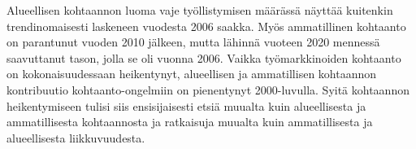\documentclass[12pt]{article}
\begin{document}
Alueellisen kohtaannon luoma vaje työllistymisen määrässä näyttää kuitenkin trendinomaisesti laskeneen vuodesta 2006 saakka. Myös ammatillinen kohtaanto on parantunut vuoden 2010 jälkeen, mutta lähinnä vuoteen 2020 mennessä saavuttanut tason, jolla se oli vuonna 2006. Vaikka työmarkkinoiden kohtaanto on kokonaisuudessaan heikentynyt, alueellisen ja ammatillisen kohtaannon kontribuutio kohtaanto-ongelmiin on pienentynyt 2000-luvulla. Syitä kohtaannon heikentymiseen tulisi siis ensisijaisesti etsiä muualta kuin alueellisesta ja ammatillisesta kohtaannosta ja ratkaisuja muualta kuin ammatillisesta ja alueellisesta liikkuvuudesta. 

 

\end{document}
